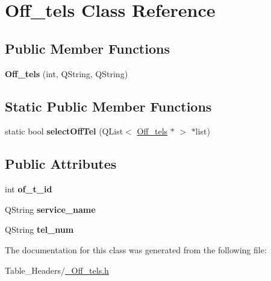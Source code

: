 \hypertarget{class_off__tels}{}\section{Off\+\_\+tels Class Reference}
\label{class_off__tels}
\subsection*{Public Member Functions}
\begin{DoxyCompactItemize}
\item 
\mbox{\label{class_off__tels_ae010a6c7331999a59c23296b8ed4a058}} 
{\bfseries Off\+\_\+tels} (int, Q\+String, Q\+String)
\end{DoxyCompactItemize}
\subsection*{Static Public Member Functions}
\begin{DoxyCompactItemize}
\item 
\mbox{\label{class_off__tels_a66192449b27ea201e38c7c301338dc84}} 
static bool {\bfseries select\+Off\+Tel} (Q\+List$<$ \mbox{\hyperlink{class_off__tels}{Off\+\_\+tels}} $\ast$ $>$ $\ast$list)
\end{DoxyCompactItemize}
\subsection*{Public Attributes}
\begin{DoxyCompactItemize}
\item 
\mbox{\label{class_off__tels_a956cfba97448a57f9844d6039d2c4280}} 
int {\bfseries of\+\_\+t\+\_\+id}
\item 
\mbox{\label{class_off__tels_a98de6127ed3a77466ea4da08d2b1203e}} 
Q\+String {\bfseries service\+\_\+name}
\item 
\mbox{\label{class_off__tels_ad315223686503d4a173c621676128c80}} 
Q\+String {\bfseries tel\+\_\+num}
\end{DoxyCompactItemize}


The documentation for this class was generated from the following file\+:\begin{DoxyCompactItemize}
\item 
Table\+\_\+\+Headers/\mbox{\hyperlink{___off__tels_8h}{\+\_\+\+Off\+\_\+tels.\+h}}\end{DoxyCompactItemize}
